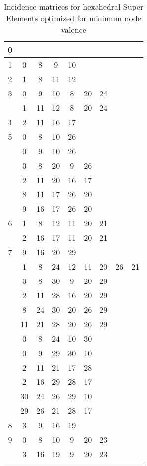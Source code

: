 \begin{table}[H]
\centering
\caption{Incidence matrices for hexahedral Super Elements optimized for minimum node valence}
\label{tab:inz_matricis_hex_minValence}
\begin{tabular}{|c|cccccccc|}
\hline
0 & & & & & & & & \\
\hline
1  & 0 & 8 & 9 & 10 &   &   &   &  \\
\hline
2  & 1 & 8 & 11 & 12 &   &   &   &  \\
\hline
3  & 0 & 9 & 10 & 8 & 20 & 24 &   &  \\
 & 1 & 11 & 12 & 8 & 20 & 24 &   &  \\
\hline
4  & 2 & 11 & 16 & 17 &   &   &   &  \\
\hline
5  & 0 & 8 & 10 & 26 &   &   &   &  \\
 & 0 & 9 & 10 & 26 &   &   &   &  \\
 & 0 & 8 & 20 & 9 & 26 &   &   &  \\
 & 2 & 11 & 20 & 16 & 17 &   &   &  \\
 & 8 & 11 & 17 & 26 & 20 &   &   &  \\
 & 9 & 16 & 17 & 26 & 20 &   &   &  \\
\hline
6  & 1 & 8 & 12 & 11 & 20 & 21 &   &  \\
 & 2 & 16 & 17 & 11 & 20 & 21 &   &  \\
\hline
7  & 9 & 16 & 20 & 29 &   &   &   &  \\
 & 1 & 8 & 24 & 12 & 11 & 20 & 26 & 21\\
 & 0 & 8 & 30 & 9 & 20 & 29 &   &  \\
 & 2 & 11 & 28 & 16 & 20 & 29 &   &  \\
 & 8 & 24 & 30 & 20 & 26 & 29 &   &  \\
 & 11 & 21 & 28 & 20 & 26 & 29 &   &  \\
 & 0 & 8 & 24 & 10 & 30 &   &   &  \\
 & 0 & 9 & 29 & 30 & 10 &   &   &  \\
 & 2 & 11 & 21 & 17 & 28 &   &   &  \\
 & 2 & 16 & 29 & 28 & 17 &   &   &  \\
 & 30 & 24 & 26 & 29 & 10 &   &   &  \\
 & 29 & 26 & 21 & 28 & 17 &   &   &  \\
\hline
8  & 3 & 9 & 16 & 19 &   &   &   &  \\
\hline
9  & 0 & 8 & 10 & 9 & 20 & 23 &   &  \\
 & 3 & 16 & 19 & 9 & 20 & 23 &   &  \\

\end{tabular}
\end{table}
